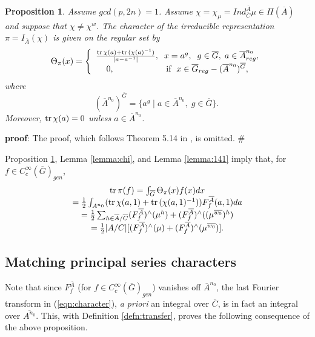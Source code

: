 \documentclass[twocolumn,10pt]{article}
\newtheorem{proposition}[theorem]{Proposition}
\begin{document}
\begin{proposition}
Assume $gcd(p,2n)=1$. Assume $\chi =\chi_\mu=
Ind_{\overline{C}}^{\overline{A}}\mu \in 
\Pi (\overline{A})$ and suppose that $\chi \neq \chi ^w$. 
The character of the
irreducible representation $\pi =I_{\overline{A}}(\chi )$
is given on the regular set by 
\[
\Theta _\pi (x)=\left\{ 
\begin{array}{c}
\frac{{\rm tr}\,\chi (a)+{\rm tr}\,(\chi (a)^{-1})}{|a-a^{-1}|},\;\;
x=a^g,\;%
\;g\in \overline{G},\;a\in \overline{A}_{reg}^{n_0}, \\ 
0,\;\;\;\;\;\;\;\;\;\;\;\;\;\;\;\;\;\;\;\;\;
{\rm \;if\;}\;
x\in \overline{G}_{reg}-(\overline{A}^{n_0})^{\overline{G}},
\end{array}
\right. 
\]
where 
\[
(\overline{A}^{n_0})^{\overline{G}}=\{a^g\;|\;
a\in \overline{A}^{n_0},\;g\in 
\overline{G}\}.\ 
\]
Moreover, ${\rm tr}\,\chi(a)=0$ unless 
$a\in \overline{A}^{n_0}$.
\label{prop:trace}
\end{proposition}

{\bf proof}: The proof, which follows Theorem 5.14
in \cite{G}, is omitted. $\#$

Proposition \ref{prop:trace}, Lemma \ref{lemma:chi}, and 
Lemma \ref{lemma:141}
imply that, for $f\in C_c^\infty (\overline{G})_{gen}$, 
\begin{equation}
\begin{array}{c}
{\rm tr}\,\pi (f)=\int_{\overline{G}}\Theta _\pi (x)f(x)dx \\ 
=\frac 12\int_{A^{n_0}}({\rm tr}\,\chi (a,1)+{\rm tr}\,(\chi
(a,1)^{-1}))F_f^{\overline{A}}(a,1)da \\ 
={1\over 2}\sum_{h\in \overline{A}/\overline{C}}
(F_f^{\overline{A}})^{\wedge }(\mu ^h)
+(F_f^{\overline{A}})^{\wedge }((\mu^{\overline{w_0}}) ^h)\\
={1\over 2}|A/C|[(F_f^{\overline{A}})^{\wedge }(\mu )
+(F_f^{\overline{A}})^{\wedge }(\mu^{\overline{w_0}})].
\end{array}
\label{eqn:character}
\end{equation}

\subsection{Matching principal series characters}

Note that since $F^{\overline{A}}_f$ (for
$f\in C_c^\infty(\overline{G})_{gen}$)
vanishes off $\overline{A}^{n_0}$,
the last Fourier transform in (\ref{eqn:character}),
 {\it a priori} an integral over $\overline{C}$,
is in fact an integral over $\overline{A^{n_0}}$.
This, with Definition \ref{defn:transfer},
proves the following consequence of the above proposition.
\end{document}
